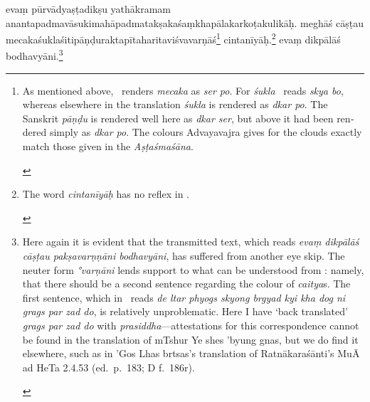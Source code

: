 \documentclass[naipra.tex]{subfiles}
\begin{document}
\begin{sanskrit}

\pstart
evaṃ pūrvādyaṣṭadikṣu yathākramam ananta\dsh padma\dsh vāsuki\dsh mahāpadma\dsh takṣaka\dsh śaṃkhapāla\dsh karkoṭa\dsh kulikāḥ.
meghāś cāṣṭau mecaka\dsh śukla\dsh śiti\dsh pāṇḍu\dsh rakta\dsh pīta\dsh harita\dsh viśvavarṇāś\footnote{
	\begin{english}%
		As mentioned above, \TIB\ renders \emph{mecaka} as \emph{ser po}.
		For \emph{śukla} \TIB\ reads \emph{skya bo}, whereas elsewhere in the translation \emph{śukla} is rendered as \emph{dkar po}.
		The Sanskrit \emph{pāṇḍu} is rendered well here as \emph{dkar ser}, but above it had been rendered simply as \emph{dkar po}.
		The colours Advayavajra gives for the clouds exactly match those given in the \emph{Aṣṭaśmaśāna}.
	\end{english}
} cintanīyāḥ.\footnote{\begin{english}
	The word \emph{cintanīyāḥ} has no reflex in \TIB .
\end{english}}
evaṃ dikpālāś  bodhavyāni.\footnote{\begin{english}
	Here again it is evident that the transmitted text, which reads \emph{evaṃ dikpālāś cāṣṭau pakṣavarṇṇāni bodhavyāni}, has suffered from another eye skip.
	The neuter form \emph{°varṇāni} lends support to what can be understood from \TIB : namely, that there should be a second sentence regarding the colour of \emph{caitya}s.
	The first sentence, which in \TIB\ reads \emph{de ltar phyogs skyong brgyad kyi kha dog ni grags par zad do}, is relatively unproblematic.
	Here I have `back translated' \emph{grags par zad do} with \emph{prasiddha}—attestations for this correspondence cannot be found in the translation of mTshur Ye shes 'byung gnas, but we do find it elsewhere, such as in 'Gos Lhas brtsas's translation of Ratnākaraśānti's MuĀ ad HeTa 2.4.53 (ed.\ p.\ 183; D f.\ 186r).


\end{english}}
\end{sanskrit}
\end{document}
